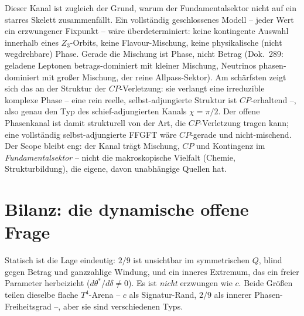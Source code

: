 Dieser Kanal ist zugleich der Grund, warum der Fundamentalsektor nicht auf ein starres Skelett
zusammenfällt. Ein vollständig geschlossenes Modell -- jeder Wert ein erzwungener Fixpunkt --
wäre überdeterminiert: keine kontingente Auswahl innerhalb eines $Z_3$-Orbits, keine
Flavour-Mischung, keine physikalische (nicht wegdrehbare) Phase. Gerade die Mischung ist Phase,
nicht Betrag (Dok.~289: geladene Leptonen betrags-dominiert mit kleiner Mischung, Neutrinos
phasen-dominiert mit großer Mischung, der reine Allpass-Sektor). Am schärfsten zeigt sich das an
der Struktur der $CP$-Verletzung: sie verlangt eine irreduzible komplexe Phase -- eine rein reelle,
selbst-adjungierte Struktur ist $CP$-erhaltend --, also genau den Typ des schief-adjungierten
Kanals $\chi=\pi/2$. Der offene Phasenkanal ist damit strukturell von der Art, die $CP$-Verletzung
tragen kann; eine vollständig selbst-adjungierte FFGFT wäre $CP$-gerade und nicht-mischend. Der
Scope bleibt eng: der Kanal trägt Mischung, $CP$ und Kontingenz im \emph{Fundamentalsektor} -- nicht
die makroskopische Vielfalt (Chemie, Strukturbildung), die eigene, davon unabhängige Quellen hat.

\section{Bilanz: die dynamische offene Frage}
Statisch ist die Lage eindeutig: $2/9$ ist unsichtbar im symmetrischen $Q$, blind gegen Betrag
und ganzzahlige Windung, und ein inneres Extremum, das ein freier Parameter herbeizieht
($d\theta^*/d\delta\neq0$). Es ist \emph{nicht} erzwungen wie $c$. Beide Größen teilen dieselbe
flache $T^4$-Arena -- $c$ als Signatur-Rand, $2/9$ als innerer Phasen-Freiheitsgrad --, aber sie
sind verschiedenen Typs.

